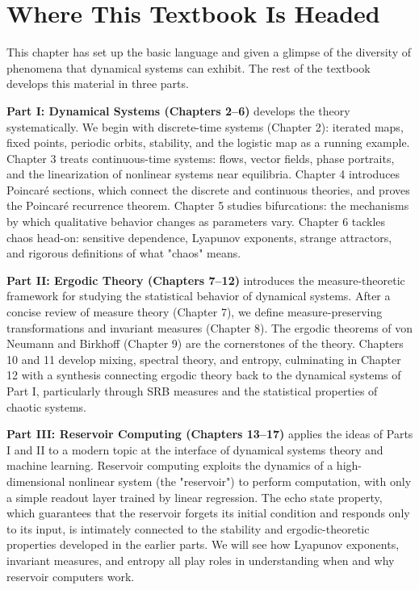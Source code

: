 \section{Where This Textbook Is Headed}\label{sec:1.7}

This chapter has set up the basic language and given a glimpse of the diversity of phenomena that dynamical systems can exhibit. The rest of the textbook develops this material in three parts.

\textbf{Part I: Dynamical Systems (Chapters 2--6)} develops the theory systematically. We begin with discrete-time systems (Chapter 2): iterated maps, fixed points, periodic orbits, stability, and the logistic map as a running example. Chapter 3 treats continuous-time systems: flows, vector fields, phase portraits, and the linearization of nonlinear systems near equilibria. Chapter 4 introduces Poincaré sections, which connect the discrete and continuous theories, and proves the Poincaré recurrence theorem. Chapter 5 studies bifurcations: the mechanisms by which qualitative behavior changes as parameters vary. Chapter 6 tackles chaos head-on: sensitive dependence, Lyapunov exponents, strange attractors, and rigorous definitions of what "chaos" means.

\textbf{Part II: Ergodic Theory (Chapters 7--12)} introduces the measure-theoretic framework for studying the statistical behavior of dynamical systems. After a concise review of measure theory (Chapter 7), we define measure-preserving transformations and invariant measures (Chapter 8). The ergodic theorems of von Neumann and Birkhoff (Chapter 9) are the cornerstones of the theory. Chapters 10 and 11 develop mixing, spectral theory, and entropy, culminating in Chapter 12 with a synthesis connecting ergodic theory back to the dynamical systems of Part I, particularly through SRB measures and the statistical properties of chaotic systems.

\textbf{Part III: Reservoir Computing (Chapters 13--17)} applies the ideas of Parts I and II to a modern topic at the interface of dynamical systems theory and machine learning. Reservoir computing exploits the dynamics of a high-dimensional nonlinear system (the "reservoir") to perform computation, with only a simple readout layer trained by linear regression. The echo state property, which guarantees that the reservoir forgets its initial condition and responds only to its input, is intimately connected to the stability and ergodic-theoretic properties developed in the earlier parts. We will see how Lyapunov exponents, invariant measures, and entropy all play roles in understanding when and why reservoir computers work.

